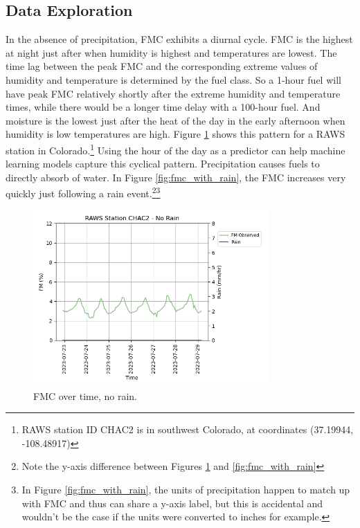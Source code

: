 \documentclass[11pt]{article}%
\begin{document}
\subsection{Data Exploration}

In the absence of precipitation, FMC exhibits a diurnal cycle. FMC is the highest at night just after when humidity is highest and temperatures are lowest. The time lag between the peak FMC and the corresponding extreme values of humidity and temperature is determined by the fuel class. So a 1-hour fuel will have peak FMC relatively shortly after the extreme humidity and temperature times, while there would be a longer time delay with a 100-hour fuel. And moisture is the lowest just after the heat of the day in the early afternoon when humidity is low temperatures are high. Figure \ref{fig:fmc_no_rain} shows this pattern for a RAWS station in Colorado.\footnote{RAWS station ID CHAC2 is in southwest Colorado, at coordinates (37.19944,	-108.48917)} Using the hour of the day as a predictor can help machine learning models capture this cyclical pattern. Precipitation causes fuels to directly absorb of water. In Figure \ref{fig:fmc_with_rain}, the FMC increases very quickly just following a rain event.\footnote{Note the y-axis difference between Figures \ref{fig:fmc_no_rain} and \ref{fig:fmc_with_rain}}\footnote{In Figure \ref{fig:fmc_with_rain}, the units of precipitation happen to match up with FMC and thus can share a y-axis label, but this is accidental and wouldn't be the case if the units were converted to inches for example.}

\begin{figure}[ht]
    \centering
    \includegraphics[width=0.8\textwidth]{images/no_rain_plot.png}
    \caption{FMC over time, no rain.}
    \label{fig:fmc_no_rain}
\end{figure}
\end{document}

